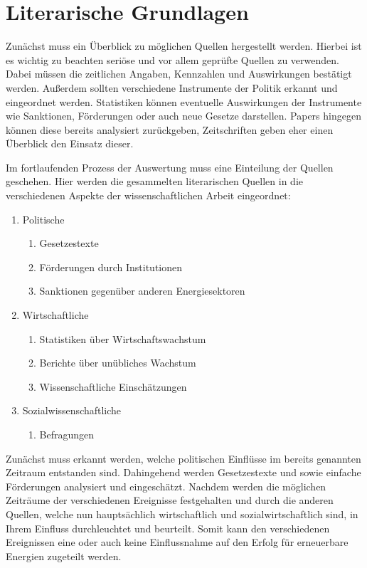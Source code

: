 \documentclass[12pt,a4paper]{article}
\begin{document}
\section*{Literarische Grundlagen}
Zunächst muss ein Überblick zu möglichen Quellen hergestellt werden. 
Hierbei ist es wichtig zu beachten seriöse und vor allem geprüfte Quellen zu verwenden. 
Dabei müssen die zeitlichen Angaben, Kennzahlen und Auswirkungen bestätigt werden. 
Außerdem sollten verschiedene Instrumente der Politik erkannt und eingeordnet werden. 
Statistiken können eventuelle Auswirkungen der Instrumente wie Sanktionen, Förderungen oder 
auch neue Gesetze darstellen. Papers hingegen können diese bereits analysiert zurückgeben, 
Zeitschriften geben eher einen Überblick den Einsatz dieser.

Im fortlaufenden Prozess der Auswertung muss eine Einteilung der Quellen geschehen. 
Hier werden die gesammelten literarischen Quellen in die verschiedenen Aspekte der 
wissenschaftlichen Arbeit eingeordnet: 

\begin{enumerate}
	\item Politische
	\begin{enumerate}
		\item Gesetzestexte
		\item Förderungen durch Institutionen
		\item Sanktionen gegenüber anderen Energiesektoren 
	\end{enumerate}
	\item Wirtschaftliche
	\begin{enumerate}
		\item Statistiken über Wirtschaftswachstum 
		\item Berichte über unübliches Wachstum  
		\item Wissenschaftliche Einschätzungen 
	\end{enumerate}
	\item Sozialwissenschaftliche
	\begin{enumerate}
		\item Befragungen
	\end{enumerate}
\end{enumerate}

Zunächst muss erkannt werden, welche politischen Einflüsse im bereits genannten Zeitraum 
entstanden sind. Dahingehend werden Gesetzestexte und sowie einfache Förderungen analysiert 
und eingeschätzt. Nachdem werden die möglichen Zeiträume der verschiedenen Ereignisse 
festgehalten und durch die anderen Quellen, welche nun hauptsächlich wirtschaftlich und 
sozialwirtschaftlich sind, in Ihrem Einfluss durchleuchtet und beurteilt. 
Somit kann den verschiedenen Ereignissen eine oder auch keine Einflussnahme auf den Erfolg 
für erneuerbare Energien zugeteilt werden. 
\end{document}
